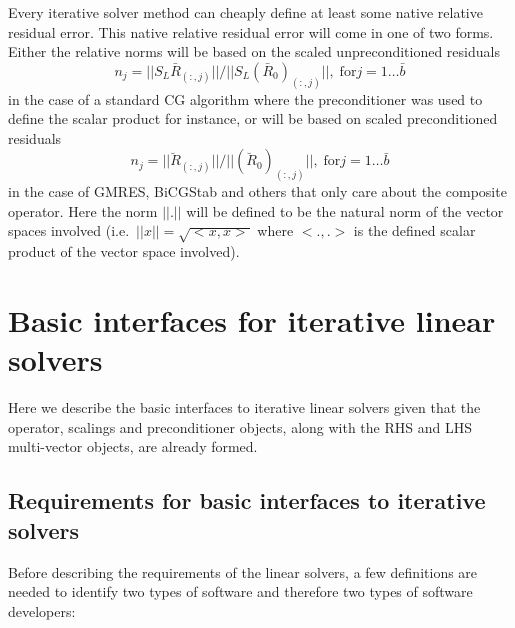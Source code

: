 \documentclass[pdf,ps2pdf,11pt]{SANDreport}
\begin{document}
Every iterative solver method can cheaply define at least some native
relative residual error.  This native relative residual error will
come in one of two forms.  Either the relative norms will be based on
the scaled unpreconditioned residuals
%
\begin{equation}
n_j = ||S_L \bar{R}_{(:,j)}|| / ||S_L (\bar{R}_0)_{(:,j)}||, \; \mbox{for} j = 1 \ldots \bar{b}
\label{belos:eqn:scaled_unprec_rel_norms}
\end{equation}
%
in the case of a standard CG algorithm where the preconditioner was
used to define the scalar product for instance, or will be based on
scaled preconditioned residuals
%
\begin{equation}
n_j = ||\breve{R}_{(:,j)}|| / ||(\breve{R}_0)_{(:,j)}||, \; \mbox{for} j = 1 \ldots \bar{b}
\label{belos:eqn:scaled_prec_rel_norms}
\end{equation}
%
in the case of GMRES, BiCGStab and others that only care about the
composite operator.  Here the norm $||.||$ will be defined to be the
natural norm of the vector spaces involved (i.e.~$||x|| =
{}\sqrt{<x,x>}$ where $<.,.>$ is the defined scalar product of the
vector space involved).

%
\section{Basic interfaces for iterative linear solvers}
%

Here we describe the basic interfaces to iterative linear solvers
given that the operator, scalings and preconditioner objects, along
with the RHS and LHS multi-vector objects, are already formed.

%
\subsection{Requirements for basic interfaces to iterative solvers}
\label{sec:requirements}
%

Before describing the requirements of the linear solvers, a few
definitions are needed to identify two types of software and therefore
two types of software developers:
\end{document}
